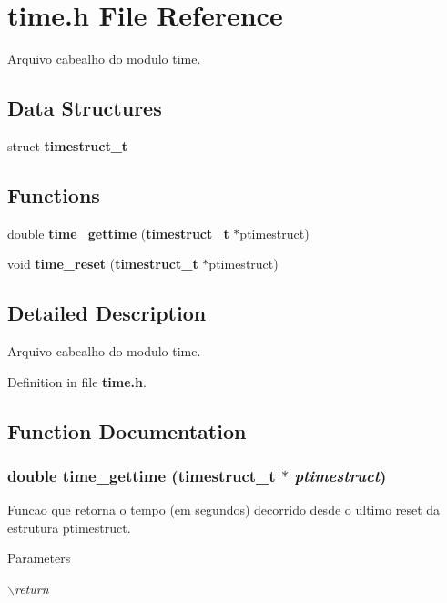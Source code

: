\section{time.h File Reference}
\label{time_8h}


Arquivo cabealho do modulo time.  
\subsection*{Data Structures}
\begin{DoxyCompactItemize}
\item 
struct {\bf timestruct\_\-t}
\end{DoxyCompactItemize}
\subsection*{Functions}
\begin{DoxyCompactItemize}
\item 
double {\bf time\_\-gettime} ({\bf timestruct\_\-t} $\ast$ptimestruct)
\item 
void {\bf time\_\-reset} ({\bf timestruct\_\-t} $\ast$ptimestruct)
\end{DoxyCompactItemize}


\subsection{Detailed Description}
Arquivo cabealho do modulo time. 

Definition in file {\bf time.h}.

\subsection{Function Documentation}
\subsubsection[{time\_\-gettime}]{\setlength{\rightskip}{0pt plus 5cm}double time\_\-gettime ({\bf timestruct\_\-t} $\ast$ {\em ptimestruct})\hspace{0.3cm}{\ttfamily  [inline]}}\label{time_8h_a6ba31bb5e9306283d9e01d5a6b7e821a}
Funcao que retorna o tempo (em segundos) decorrido desde o ultimo reset da estrutura ptimestruct. 
\begin{DoxyParams}{Parameters}
\item[{\em $\backslash$return}]\end{DoxyParams}


